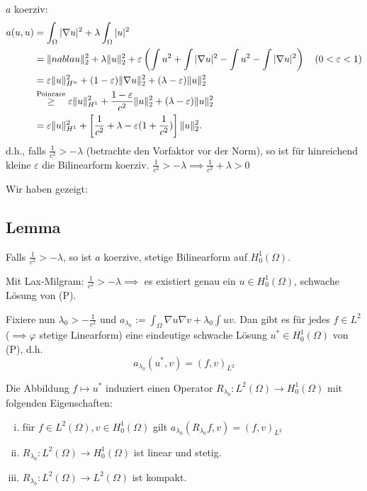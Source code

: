 $a$ koerziv: 
\begin{align*}
a(u,u) 
&= \int_\Omega |\nabla u|^2 + \lambda \int_\Omega |u|^2 \\
&= \lVert nabla u \rVert_2^2 + \lambda \lVert u \rVert_2^2 + \varepsilon \left( \int u^2 + \int |\nabla u|^2 - \int u^2 - \int |\nabla u|^2 \right) \quad (0 < \varepsilon < 1) \\
&= \varepsilon \lVert u \rVert_{H^n}^2 + (1 - \varepsilon) \lVert \nabla u \rVert_2^2 + (\lambda - \varepsilon) \lVert u \rVert_2^2 \\
&\overset{\text{Poincare}}{\geq} \varepsilon \lVert u \rVert_{H^1}^2 + \frac{1 - \varepsilon}{c^2} \lVert u \rVert_2^2 + (\lambda - \varepsilon) \lVert u \rVert_2^2 \\
&= \varepsilon \lVert u \rVert_{H^1}^2 + \left[ \frac{1}{c^2} + \lambda - \varepsilon (1 + \frac{1}{c^2}) \right] \lVert u \rVert_2^2.
\end{align*}
d.h., falls $\frac{1}{c^2} > -\lambda$ (betrachte den Vorfaktor vor der Norm), so ist für hinreichend kleine $\varepsilon$ die Bilinearform koerziv.
{\tiny{$\frac{1}{c^2} > -\lambda \implies \frac{1}{c^2} + \lambda > 0$}}

Wir haben gezeigt:
\subsection{Lemma}
Falls $\frac{1}{c^2} > - \lambda$, so ist $a$ koerzive, stetige Bilinearform auf $H_0^1(\Omega)$.

Mit Lax-Milgram: $\frac{1}{c^2} > -\lambda \implies$ es existiert genau ein $u \in H_0^1(\Omega)$, schwache Lösung von (P).

Fixiere nun $\lambda_0 > -\frac{1}{c^2}$ und $a_{\lambda_0} := \int_\Omega \nabla u \nabla v + \lambda_0 \int uv$.
Dan gibt es für jedes $f \in L^2$ ($\implies \varphi$ stetige Linearform) eine eindeutige schwache Lösung $u^* \in H_0^1(\Omega)$ von (P), d.h.
$$
a_{\lambda_0}(u^*, v) = (f,v)_{L^2}
$$

Die Abbildung $f \mapsto u^*$ induziert einen Operator $R_{\lambda_0} \colon L^2(\Omega) \to H_0^1(\Omega)$ mit folgenden Eigenschaften:
\begin{enumerate}[i)]
  \item für $f \in L^2(\Omega), v \in H_0^1(\Omega)$ gilt $a_{\lambda_0}(R_{\lambda_0} f, v) = (f,v)_{L^2}$
  \item $R_{\lambda_0} \colon L^2(\Omega) \to H_0^1(\Omega)$ ist linear und stetig.
  \item $R_{\lambda_0} \colon L^2(\Omega) \to L^2(\Omega)$ ist kompakt.
\end{enumerate}

